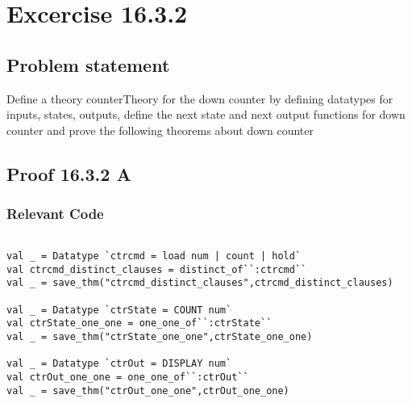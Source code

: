 \documentclass{report}
\begin{document}
\chapter{Excercise 16.3.2}
\label{cha:16.3.2}

\section{Problem statement}
\label{problem-statement-2}
Define a theory counterTheory for the down counter by defining
datatypes for inputs, states, outputs, define the next state and next
output functions for down counter and prove the following theorems
about down counter

\begin{quote}
\HOLcounterTheoremsctrcmdXXdistinctXXclauses
{}\HOLcounterTheoremsctrStateXXoneXXone
{}\HOLcounterTheoremsctrOutXXoneXXone
{}\HOLcounterTheoremsctrTRXXrules
{}\HOLcounterTheoremsctrTRXXclauses
{}\HOLcounterTheoremsctrTransXXEquivXXTR
{}\HOLcounterTheoremsctrXXrules
\end{quote}


\section{Proof 16.3.2 A}
\label{proof-4}

\subsection{Relevant Code}
\label{rel-code-4}
\begin{lstlisting}[frame=TBlr]

val _ = Datatype `ctrcmd = load num | count | hold`
val ctrcmd_distinct_clauses = distinct_of``:ctrcmd``
val _ = save_thm("ctrcmd_distinct_clauses",ctrcmd_distinct_clauses)

val _ = Datatype `ctrState = COUNT num`
val ctrState_one_one = one_one_of``:ctrState``
val _ = save_thm("ctrState_one_one",ctrState_one_one)

val _ = Datatype `ctrOut = DISPLAY num`
val ctrOut_one_one = one_one_of``:ctrOut``
val _ = save_thm("ctrOut_one_one",ctrOut_one_one)

\end{lstlisting}
\end{document}
